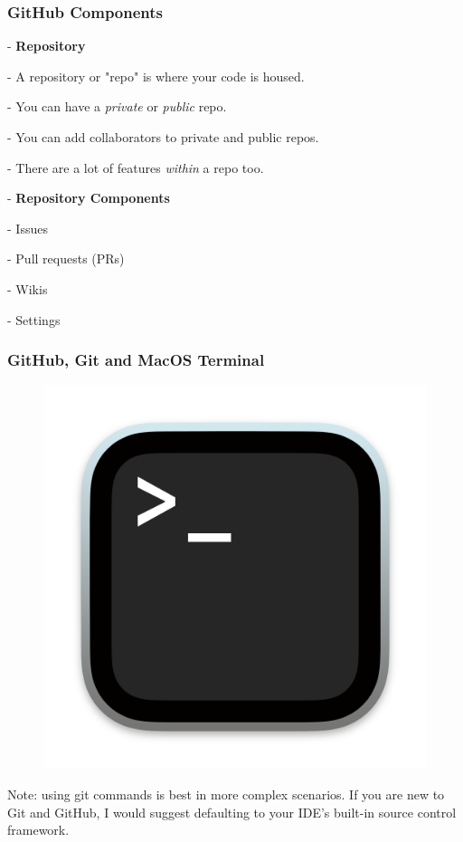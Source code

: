 \documentclass{beamer}
\begin{document}
\begin{frame}
\frametitle{GitHub Components}

- \textbf{Repository}

\hspace{10mm} - A repository or "repo" is where your code is housed.

\hspace{10mm} - You can have a \textit{private} or \textit{public} repo.

\hspace{10mm} - You can add collaborators to private and public repos.

\hspace{10mm} - There are a lot of features \textit{within} a repo too.

- \textbf{Repository Components}

\hspace{10mm} - Issues

\hspace{10mm} - Pull requests (PRs)

\hspace{10mm} - Wikis

\hspace{10mm} - Settings

\end{frame}

\begin{frame}
\frametitle{GitHub, Git and MacOS Terminal}

\begin{figure}[t]
\includegraphics[scale=0.1]{images/macterm.png}
\end{figure}



\tiny Note: using git commands is best in more complex scenarios. If you are new to Git and GitHub, I would suggest defaulting to your IDE's built-in source control framework.
\end{frame}
\end{document}
